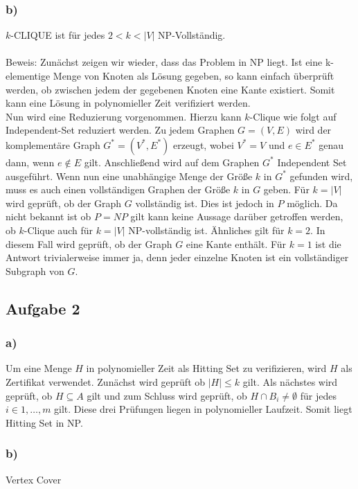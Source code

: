 \documentclass[12pt,a4paper]{article}
\begin{document}
\subsubsection*{b)}
$k$-CLIQUE ist für jedes $2 < k < |V|$ NP-Vollständig. 
\\\\
Beweis: Zunächst zeigen wir wieder, dass das Problem in NP liegt. Ist eine k-elementige Menge von Knoten als Lösung gegeben, so kann einfach überprüft werden, ob zwischen jedem der gegebenen Knoten eine Kante existiert. Somit kann eine Lösung in polynomieller Zeit verifiziert werden.\\
Nun wird eine Reduzierung vorgenommen. Hierzu kann $k$-Clique wie folgt auf Independent-Set reduziert werden. Zu jedem Graphen $G=(V,E)$ wird der komplementäre Graph $G^*=(V^*,E^*)$ erzeugt, wobei $V^*=V$ und $e \in E^*$ genau dann, wenn $e \notin E$ gilt. Anschließend wird auf dem Graphen $G^*$ Independent Set ausgeführt. Wenn nun eine unabhängige Menge der Größe $k$ in $G^*$ gefunden wird, muss es auch einen vollständigen Graphen der Größe $k$ in $G$ geben.
Für $k=|V|$ wird geprüft, ob der Graph $G$ vollständig ist. Dies ist jedoch in $P$ möglich. Da nicht bekannt ist ob $P=NP$ gilt kann keine Aussage darüber getroffen werden, ob $k$-Clique auch für $k=|V|$ NP-vollständig ist. Ähnliches gilt für $k=2$. In diesem Fall wird geprüft, ob der Graph $G$ eine Kante enthält.
Für $k=1$ ist die Antwort trivialerweise immer ja, denn jeder einzelne Knoten ist ein vollständiger Subgraph von $G$.

\subsection*{Aufgabe 2}
\subsubsection*{a)}
Um eine Menge $H$ in polynomieller Zeit als Hitting Set zu verifizieren, wird $H$ als Zertifikat verwendet.
Zunächst wird geprüft ob $|H|\le k$ gilt. Als nächstes wird geprüft, ob $H \subseteq A$ gilt und zum Schluss wird geprüft, ob $H \cap B_i \neq \emptyset$ für jedes $i \in {1,\dots,m}$ gilt.
Diese drei Prüfungen liegen in polynomieller Laufzeit. Somit liegt Hitting Set in NP.



\subsubsection*{b)}
Vertex Cover
\end{document}
